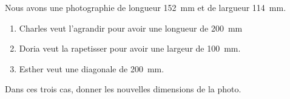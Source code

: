 
\begin{exercice}\label{exo2smath-0057}

    Nous avons une photographie de longueur \SI{152}{\milli\meter} et de largueur \SI{114}{\milli\meter}.
    \begin{enumerate}
        \item
            Charles veut l'agrandir pour avoir une longueur de \SI{200}{\milli\meter}
        \item
            Doria veut la rapetisser pour avoir une largeur de \SI{100}{\milli\meter}.
        \item
            Esther veut une diagonale de \SI{200}{\milli\meter}.
    \end{enumerate}
    Dans ces trois cas, donner les nouvelles dimensions de la photo.

\end{exercice}
